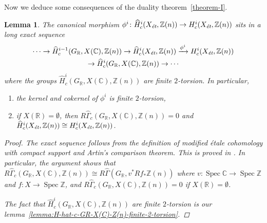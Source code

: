 \documentclass[leqno,12pt]{article}
\theoremstyle{plain}
\newtheorem{lemma}[theorem]{\indent\sc Lemma}
\theoremstyle{definition}
\DeclareMathOperator{\Spec}{Spec}
\newcommand{\CC}{\mathbb{C}}
\newcommand{\RR}{\mathbb{R}}
\newcommand{\ZZ}{\mathbb{Z}}
\newcommand{\et}{\text{\it \'{e}t}}
\begin{document}
Now we deduce some consequences of the duality theorem~\ref{theorem-I}.

\begin{lemma}
  \label{lemma:morphism-hat-Hc(Xet,Z(n))->Hc(Xet,Z(n))}
  The canonical morphism
  $\phi^i\colon \widehat{H}^i_c (X_\et, \ZZ (n)) \to H^i_c (X_\et, \ZZ (n))$
  sits in a long exact sequence
  \begin{multline*}
    \cdots \to \widehat{H}^{i-1}_c (G_\RR, X (\CC), \ZZ (n)) \to
    \widehat{H}_c^i (X_\et, \ZZ(n)) \xrightarrow{\phi^i}
    H_c^i (X_\et, \ZZ(n)) \\
    \to \widehat{H}^i_c (G_\RR, X (\CC), \ZZ (n)) \to \cdots
  \end{multline*}
  where the groups $\widehat{H}^i_c (G_\RR, X (\CC), \ZZ
  (n))$ are finite $2$-torsion. In particular,
  \begin{enumerate}
  \item[$1)$] the kernel and cokernel of $\phi^i$ is finite $2$-torsion,

  \item[$2)$] if $X (\RR) = \emptyset$, then
    $R\widehat{\Gamma}_c (G_\RR, X (\CC), \ZZ (n)) = 0$ and
    $\widehat{H}^i_c (X_\et, \ZZ (n)) \cong H^i_c (X_\et, \ZZ (n))$.
  \end{enumerate}

  \begin{proof}
    The exact sequence follows from the definition of modified \'{e}tale cohomology
    with compact support and Artin's comparison theorem. This is proved in
    \cite[Lemma~6.14]{Flach-Morin-2018}. In particular, the argument shows that
    $R\widehat{\Gamma}_c (G_\RR, X (\CC), \ZZ (n)) \cong
    R\widehat{\Gamma} (G_\RR, v^* Rf_* \ZZ(n))$ where
    $v\colon \Spec \CC \to \Spec \ZZ$ and $f\colon X\to \Spec \ZZ$,
    and $R\widehat{\Gamma}_c (G_\RR, X (\CC), \ZZ (n)) = 0$ if
    $X (\RR) = \emptyset$.

    The fact that $\widehat{H}^i_c (G_\RR, X (\CC), \ZZ (n))$ are finite
    $2$-torsion is our lemma~\ref{lemma:H-hat-c-GR-X(C)-Z(n)-finite-2-torsion}.
  \end{proof}
\end{lemma}
\end{document}
